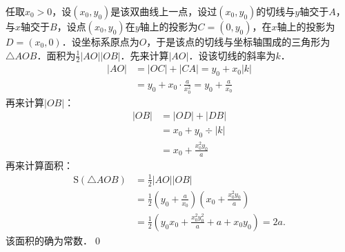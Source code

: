 \prove 任取$x_0 > 0$，设$(x_0,y_0)$是该双曲线上一点，设过$(x_0,y_0)$的切线与$y$轴交于$A$，与$x$轴交于$B$，设点$(x_0,y_0)$在$y$轴上的投影为$C=(0,y_0)$，在$x$轴上的投影为$D=(x_0,0)$．设坐标系原点为$O$，于是该点的切线与坐标轴围成的三角形为$\triangle AOB$．面积为$\displaystyle\frac{1}{2}\lvert AO \rvert \lvert OB \rvert$．先来计算$\lvert AO \rvert$．设该切线的斜率为$k$．
\begin{align}
    \lvert AO \rvert &= \lvert OC \rvert + \lvert CA \rvert = y_0 + x_0 \lvert k \rvert \\
    &= y_0 + x_0 \cdot \frac{a}{x_0^2} = y_0 + \frac{a}{x_0}
\end{align}
再来计算$\lvert OB \rvert$：
\begin{align}
    \lvert OB \rvert &= \lvert OD \rvert + \lvert DB \rvert \\
    &= x_0 + y_0 \div \lvert k \rvert \\
    &= x_0 + \frac{x_0^2 y_0}{a}
\end{align}
再来计算面积：
\begin{align}
    \mathrm{S}(\triangle AOB) &= \frac{1}{2} \lvert AO \rvert \lvert OB \rvert \\
    &= \frac{1}{2} \left(y_0 + \frac{a}{x_0}\right)\left(x_0+\frac{x_0^2y_0}{a}\right) \\
    &= \frac{1}{2} \left(y_0 x_0 + \frac{x_0^2y_0^2}{a} + a + x_0y_0\right) = 2a.
\end{align}
该面积的确为常数．\qed\bigskip
